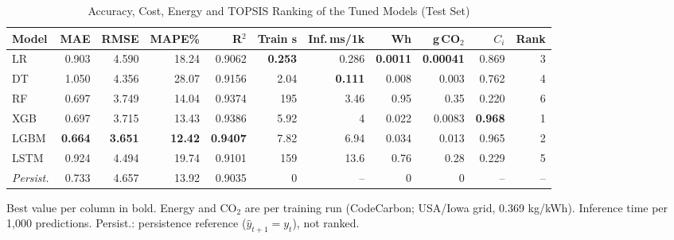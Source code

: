 \begin{table}[!b]
\centering
\caption{Accuracy, Cost, Energy and TOPSIS Ranking of the Tuned Models (Test Set)}
\label{tab:results}
\footnotesize
\setlength{\tabcolsep}{4pt}
\begin{adjustbox}{max width=\textwidth}
\begin{tabular}{lrrrrrrrrrr}
\toprule
Model & MAE & RMSE & MAPE\% & R$^2$ & Train s & Inf.\,ms/1k & Wh & g\,CO$_2$ & $C_i$ & Rank \\
\midrule
LR & 0.903 & 4.590 & 18.24 & 0.9062 & \textbf{0.253} & 0.286 & \textbf{0.0011} & \textbf{0.00041} & 0.869 & 3 \\
DT & 1.050 & 4.356 & 28.07 & 0.9156 & 2.04 & \textbf{0.111} & 0.008 & 0.003 & 0.762 & 4 \\
RF & 0.697 & 3.749 & 14.04 & 0.9374 & 195 & 3.46 & 0.95 & 0.35 & 0.220 & 6 \\
XGB & 0.697 & 3.715 & 13.43 & 0.9386 & 5.92 & 4 & 0.022 & 0.0083 & \textbf{0.968} & 1 \\
LGBM & \textbf{0.664} & \textbf{3.651} & \textbf{12.42} & \textbf{0.9407} & 7.82 & 6.94 & 0.034 & 0.013 & 0.965 & 2 \\
LSTM & 0.924 & 4.494 & 19.74 & 0.9101 & 159 & 13.6 & 0.76 & 0.28 & 0.229 & 5 \\
\textit{Persist.} & 0.733 & 4.657 & 13.92 & 0.9035 & 0 & -- & 0 & 0 & -- & -- \\
\bottomrule
\end{tabular}
\end{adjustbox}
\par\vspace{3pt}
{\scriptsize Best value per column in bold. Energy and CO$_2$ are per training run (CodeCarbon; USA/Iowa grid, 0.369 kg/kWh). Inference time per 1{,}000 predictions. Persist.: persistence reference ($\hat{y}_{t+1}=y_t$), not ranked.\par}
\end{table}

